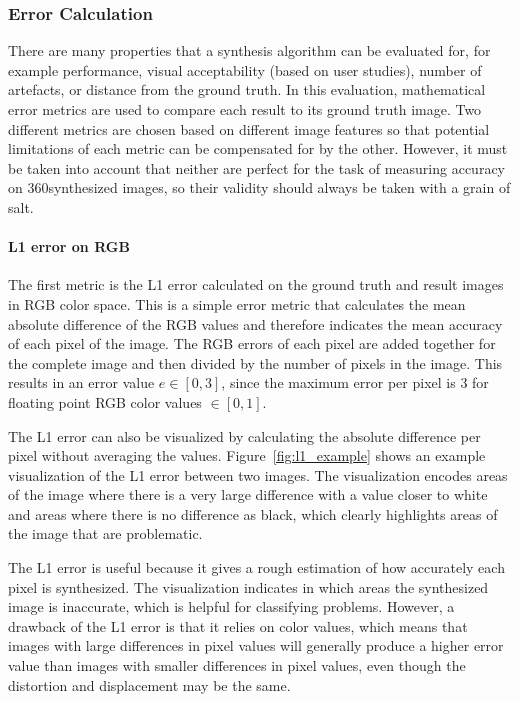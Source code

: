 \subsubsection{Error Calculation}
There are many properties that a synthesis algorithm can be evaluated for, for example performance, visual acceptability (based on user studies), number of artefacts, or distance from the ground truth. In this evaluation, mathematical
error metrics are used to compare each result to its ground truth image.  Two different metrics are chosen based on different image features so that potential limitations of each metric can be compensated for by the other. However, it must be taken into account that neither are perfect for the task of measuring accuracy on 360\degree synthesized images, so their validity should always be taken with a grain of salt. 

\paragraph{L1 error on RGB}
The first metric is the L1 error calculated on the ground truth and result images in RGB color space. This is a simple error metric that calculates the mean absolute difference of the RGB values and therefore indicates the mean accuracy of each pixel of the image. The RGB errors of each pixel are added together for the complete image and then divided by the number of pixels in the image. This results in an error value $e \in [0,3]$, since the maximum error per pixel is 3 for floating point RGB color values $\in [0,1]$.

The L1 error can also be visualized by calculating the absolute difference per pixel without averaging the values. Figure~\ref{fig:l1_example} shows an example visualization of the L1 error between two images. The visualization encodes areas of the image where there is a very large difference with a value closer to white and areas where there is no difference as black, which clearly highlights areas of the image that are problematic.

The L1 error is useful because it gives a rough estimation of how accurately each pixel is synthesized. The visualization indicates in which areas the synthesized image is inaccurate, which is helpful for classifying problems. However, a drawback of the L1 error is that it relies on color values, which means that images with large differences in pixel values will generally produce a higher error value than images with smaller differences in pixel values, even though the distortion and displacement may be the same.

